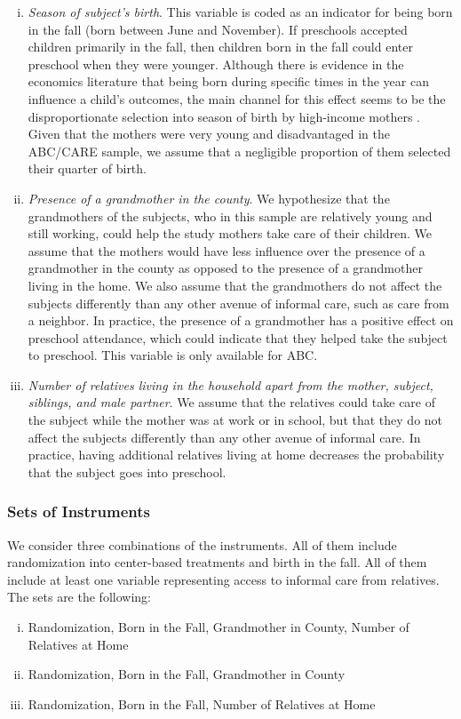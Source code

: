 \begin{enumerate}[(i)]
\item \textit{Season of subject's birth}. This variable is coded as an indicator for being born in the fall (born between June and November). If preschools accepted children primarily in the fall, then children born in the fall could enter preschool when they were younger. Although there is evidence in the economics literature that being born during specific times in the year can influence a child's outcomes, the main channel for this effect seems to be the disproportionate selection into season of birth by high-income mothers \citep{Buckles-Hungerman_2013_RES}. Given that the mothers were very young and disadvantaged in the ABC/CARE sample, we assume that a negligible proportion of them selected their quarter of birth.

\item \textit{Presence of a grandmother in the county}. We hypothesize that the grandmothers of the subjects, who in this sample are relatively young and still working, could help the study mothers take care of their children. We assume that the mothers would have less influence over the presence of a grandmother in the county as opposed to the presence of a grandmother living in the home. We also assume that the grandmothers do not affect the subjects differently than any other avenue of informal care, such as care from a neighbor. In practice, the presence of a grandmother has a positive effect on preschool attendance, which could indicate that they helped take the subject to preschool. This variable is only available for ABC.

\item \textit{Number of relatives living in the household apart from the mother, subject, siblings, and male partner}. We assume that the relatives could take care of the subject while the mother was at work or in school, but that they do not affect the subjects differently than any other avenue of informal care. In practice, having additional relatives living at home decreases the probability that the subject goes into preschool.
\end{enumerate}

\subsubsection{Sets of Instruments}
\noindent We consider three combinations of the instruments.  All of them include randomization into center-based treatments and birth in the fall. All of them include at least one variable representing access to informal care from relatives. The sets are the following:
\begin{enumerate}[(i)]
\item Randomization, Born in the Fall, Grandmother in County, Number of Relatives at Home
\item Randomization, Born in the Fall, Grandmother in County
\item Randomization, Born in the Fall, Number of Relatives at Home
\end{enumerate}

